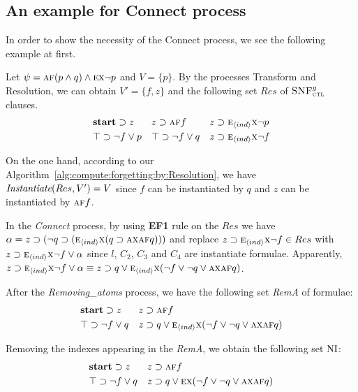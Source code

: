 \documentclass[letterpaper]{article} %
\begin{document}
\subsection{An example for Connect process}
In order to show the necessity of the Connect process, we see the following example at first.
\begin{example}
Let $\psi=\textsc{a}\textsc{f}(p \wedge q) \wedge \textsc{e} \textsc{x} \neg p$ and $V=\{p\}$.
By the processes Transform and Resolution, we can obtain $V'=\{f,z\}$ and the following set $Res$ of ${\textsc{SNF}_{\textsc{ctl}}^g}$ clauses.
\begin{align*}
& \textbf{start} \supset z && z \supset \textsc{a}\textsc{f} f && z \supset  \textsc{e}_{{\langle{ind}\rangle}} \textsc{x} \neg p \\
& \top \supset \neg f \vee p && \top \supset \neg f \vee q && z \supset \textsc{e}_{{\langle{ind}\rangle}} \textsc{x} \neg f
\end{align*}

On the one hand, according to our Algorithm~\ref{alg:compute:forgetting:by:Resolution}, we have $\emph{Instantiate}(Res,V')=V$ since $f$ can be instantiated by $q$ and $z$ can be instantiated by $\textsc{a}\textsc{f} f$.

In the \emph{Connect} process, by using \textbf{EF1} rule on the $Res$ we have $\alpha=z \supset (\neg q \supset  (\textsc{e}_{{\langle{ind}\rangle}}\textsc{x} (q \supset \textsc{a}\textsc{x} \textsc{a}\textsc{f} q )))$ and replace $z \supset \textsc{e}_{{\langle{ind}\rangle}} \textsc{x} \neg f \in Res$ with $z \supset \textsc{e}_{{\langle{ind}\rangle}} \textsc{x} \neg f \vee \alpha$ since $l$, $C_2$, $C_3$ and $C_4$ are instantiate formulae.
Apparently, $z \supset \textsc{e}_{{\langle{ind}\rangle}} \textsc{x} \neg f \vee \alpha \equiv z \supset q \vee \textsc{e}_{{\langle{ind}\rangle}} \textsc{x}(\neg f \vee \neg q \vee \textsc{a}\textsc{x} \textsc{a}\textsc{f} q)$.

After the \emph{Removing\_atoms} process, we have the following set \emph{RemA} of formulae:
\begin{align*}
& \textbf{start} \supset z && z \supset \textsc{a}\textsc{f} f \\
&  \top \supset \neg f \vee q && z \supset q \vee \textsc{e}_{{\langle{ind}\rangle}} \textsc{x}(\neg f \vee \neg q \vee \textsc{a}\textsc{x} \textsc{a}\textsc{f} q)
\end{align*}

Removing the indexes appearing in the \emph{RemA}, we obtain the following set $\textrm{NI}$:
 \begin{align*}
& \textbf{start} \supset z && z \supset \textsc{a}\textsc{f} f \\
&  \top \supset \neg f \vee q && z \supset q \vee \textsc{e} \textsc{x}(\neg f \vee \neg q \vee \textsc{a}\textsc{x} \textsc{a}\textsc{f} q)
\end{align*}


\end{example}
\end{document}
